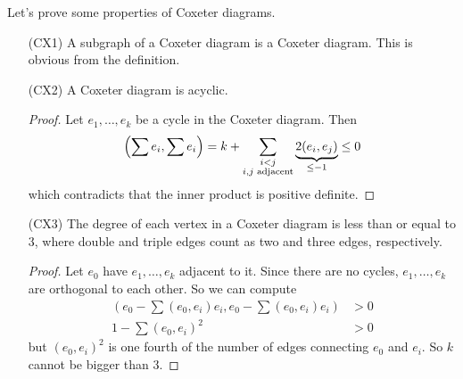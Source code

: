  Let's prove some properties of Coxeter diagrams.
 \begin{itemize}
 \item[\hypertarget{CX1}{(CX1)}] A subgraph of a Coxeter diagram is a Coxeter diagram.
 This is obvious from the definition.

 \item[\hypertarget{CX2}{(CX2)}] A Coxeter diagram is acyclic.
 \begin{proof}
   Let $e_1,\dots, e_k$ be a cycle in the Coxeter diagram. Then
   \[
     \Bigl(\sum e_i, \sum e_i\Bigr) = k + \sum_{\substack{i< j\\ i,j\text{ adjacent}}}
     \underbrace{2(e_i,e_j)}_{\le {-1}} \le 0
   \]
   which contradicts that the inner product is positive definite.
 \end{proof}

 \item[\hypertarget{CX3}{(CX3)}] The degree of each vertex in a Coxeter diagram is
 less than or equal to 3, where double and triple edges count as two and
 three edges, respectively.
 \begin{proof}
   Let $e_0$ have $e_1,\dots, e_k$ adjacent to it. Since there are no cycles,
   $e_1,\dots, e_k$ are orthogonal to each other. So we can compute
   \begin{align*}
     \left(e_0 - \sum (e_0,e_i) e_i, e_0 - \sum (e_0,e_i) e_i \right) & > 0\\
       1- \sum (e_0,e_i)^2 &> 0
   \end{align*}
   but $(e_0,e_i)^2$ is one fourth of the number of edges connecting $e_0$ and $e_i$.
   So $k$ cannot be bigger than 3.
 \end{proof}


\end{itemize}

